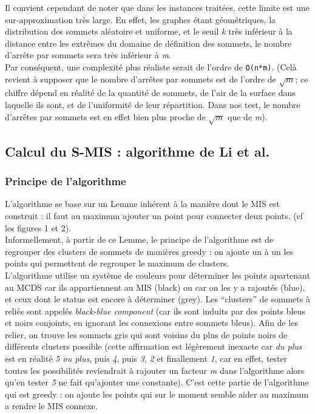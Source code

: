 \documentclass[]{report}
\begin{document}
Il convient cependant de noter que dans les instances traitées, cette
limite est une sur-approximation très large. En effet, les graphes étant
géométriques, la distribution des sommets aléatoire et uniforme, et le
seuil \emph{k} très inférieur à la distance entre les extrèmes du
domaine de définition des sommets, le nombre d'arrête par sommets sera
très inférieur à \emph{m}.\\
Par conséquent, une complexité plus réaliste serait de l'ordre de
\lstinline!O(n*m)!. (Celà revient à supposer que le nombre d'arrêtes par
sommets est de l'ordre de \(\sqrt{m}\); ce chiffre dépend en réalité de
la quantité de sommets, de l'air de la surface dans laquelle ils sont,
et de l'uniformité de leur répartition. Dans nos test, le nombre
d'arrêtes par sommets est en effet bien plus proche de \(\sqrt{m}\) que
de \emph{m}).

\subsection{Calcul du S-MIS : algorithme de Li et
al.}\label{calcul-du-s-mis-algorithme-de-li-et-al.}

\subsubsection{Principe de l'algorithme}\label{principe-de-lalgorithme}

L'algorithme se base sur un Lemme inhérent à la manière dont le MIS est
construit : il faut au maximum ajouter un point pour connecter deux
points. (cf les figures 1 et 2).\\
Informellement, à partir de ce Lemme, le principe de l'algorithme est de
regrouper des clusters de sommets de manières greedy : on ajoute un à un
les points qui permettent de regrouper le maximum de clusters.\\
L'algorithme utilise un système de couleurs pour déterminer les points
apartenant au MCDS car ils appartiennent au MIS (black) ou car on les y
a rajoutés (blue), et ceux dont le status est encore à déterminer
(grey). Les ``clusters'' de sommets à reliés sont appelés
\emph{black-blue component} (car ils sont induits par des points bleus
et noirs conjoints, en ignorant les connexions entre sommets bleus).
Afin de les relier, on trouve les sommets gris qui sont voisins du plus
de points noirs de différents clusters possible (cette affirmation est
légèrement inexacte car \emph{du plus} est en réalité \emph{5 ou plus},
puis \emph{4}, puis \emph{3}, \emph{2} et finallement \emph{1}, car en
effet, tester toutes les possibilités reviendrait à rajouter un facteur
\emph{m} dans l'algorithme alors qu'en tester \emph{5} ne fait
qu'ajouter une constante). C'est cette partie de l'algorithme qui est
greedy : on ajoute les points qui sur le moment semble aider au maximum
a rendre le MIS connexe.
\end{document}
